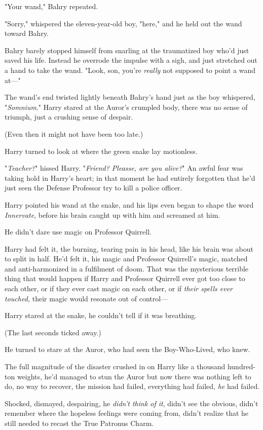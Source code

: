 "Your wand," Bahry repeated.

"Sorry," whispered the eleven-year-old boy, "here," and he held out the wand
toward Bahry.

Bahry barely stopped himself from snarling at the traumatized boy who'd just
saved his life. Instead he overrode the impulse with a sigh, and just stretched
out a hand to take the wand. "Look, son, you're \emph{really} not supposed to
point a wand at---"

The wand's end twisted lightly beneath Bahry's hand just as the boy whispered,
"\emph{Somnium}."
\later
Harry stared at the Auror's crumpled body, there was no sense of triumph, just
a crushing sense of despair.

(Even then it might not have been too late.)

Harry turned to look at where the green snake lay motionless.

"\emph{Teacher?}" hissed Harry. "\emph{Friend? Pleasse, are you alive?}" An
awful fear was taking hold in Harry's heart; in that moment he had entirely
forgotten that he'd just seen the Defense Professor try to kill a police
officer.

Harry pointed his wand at the snake, and his lips even began to shape the word
\emph{Innervate}, before his brain caught up with him and screamed at him.

He didn't dare use magic on Professor Quirrell.

Harry had felt it, the burning, tearing pain in his head, like his brain was
about to split in half. He'd felt it, his magic and Professor Quirrell's magic,
matched and anti-harmonized in a fulfilment of doom. That was the mysterious
terrible thing that would happen if Harry and Professor Quirrell ever got too
close to each other, or if they ever cast magic on each other, or if
\emph{their spells ever touched,} their magic would resonate out of control---

Harry stared at the snake, he couldn't tell if it was breathing.

(The last seconds ticked away.)

He turned to stare at the Auror, who had seen the Boy-Who-Lived, who knew.

The full magnitude of the disaster crushed in on Harry like a thousand
hundred-ton weights, he'd managed to stun the Auror but now there was nothing
left to do, no way to recover, the mission had failed, everything had failed,
\emph{he} had failed.

Shocked, dismayed, despairing, he \emph{didn't think of it}, didn't see the
obvious, didn't remember where the hopeless feelings were coming from, didn't
realize that he still needed to recast the True Patronus Charm.

